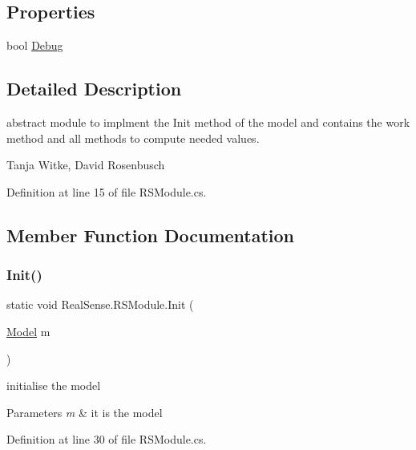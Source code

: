 \subsection*{Properties}
\begin{DoxyCompactItemize}
\item 
bool \hyperlink{class_real_sense_1_1_r_s_module_a89c9c568ab387b183a63ed2755a82203}{Debug}
\end{DoxyCompactItemize}


\subsection{Detailed Description}
abstract module to implment the Init method of the model and contains the work method and all methods to compute needed values.

Tanja Witke, David Rosenbusch 

Definition at line 15 of file R\+S\+Module.\+cs.



\subsection{Member Function Documentation}
\mbox{\label{class_real_sense_1_1_r_s_module_a4a96119975932690f75e86206e1fe63d}} 
\subsubsection{\texorpdfstring{Init()}{Init()}}
{\footnotesize\ttfamily static void Real\+Sense.\+R\+S\+Module.\+Init (\begin{DoxyParamCaption}\item[{\hyperlink{class_real_sense_1_1_model}{Model}}]{m }\end{DoxyParamCaption})\hspace{0.3cm}{\ttfamily [static]}}

initialise the model 
\begin{DoxyParams}{Parameters}
{\em m} & it is the model \\
\hline
\end{DoxyParams}


Definition at line 30 of file R\+S\+Module.\+cs.

